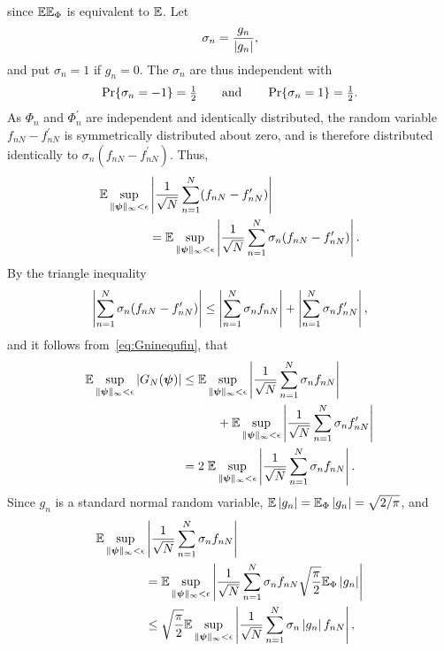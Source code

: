 \documentclass[journal]{IEEEtran}
\begin{document}
\begin{IEEEproof}
\begin{equation}
\end{equation}
since ${\mathbb E} {\mathbb E}_\Phi$ is equivalent to ${\mathbb E}$.   Let
\[
\sigma_n = \frac{g_n}{\left\vert g_n \right\vert},
\]
and put $\sigma_n = 1$ if $g_n = 0$.  The $\sigma_n$ are thus independent with 
\[
\operatorname{Pr}\{ \sigma_n = -1 \} = \tfrac{1}{2} \qquad \text{and} \qquad  \operatorname{Pr}\{ \sigma_n = 1 \} = \tfrac{1}{2}.
\]  
As $\Phi_n$ and $\Phi_n^\prime$ are independent and identically distributed, the random variable $f_{nN} - f_{nN}^\prime$ is symmetrically distributed about zero, and is therefore distributed identically to $\sigma_n( f_{nN} - f_{nN}^\prime)$.  Thus,
\begin{align*}
 {\mathbb E} \sup_{\|\boldsymbol{\psi}\|_{\infty} < \epsilon}  &\left\vert   \frac{1}{\sqrt{N}}\sum_{n=1}^{N}  (f_{nN} - f_{nN}^\prime)  \right\vert \\
&= {\mathbb E} \sup_{\|\boldsymbol{\psi}\|_{\infty} < \epsilon}  \left\vert   \frac{1}{\sqrt{N}}\sum_{n=1}^{N} \sigma_n ( f_{nN} - f_{nN}^\prime)  \right\vert.
\end{align*}
By the triangle inequality
\[
\left\vert  \sum_{n=1}^{N} \sigma_n (f_{nN} - f_{nN}^\prime) \right\vert \leq \left\vert  \sum_{n=1}^{N} \sigma_n f_{nN}  \right\vert + \left\vert  \sum_{n=1}^{N}  \sigma_n f_{nN}^\prime  \right\vert,
\]
and it follows from~\eqref{eq:Gninequfin}, that
\begin{align*}
 {\mathbb E} \sup_{\|\boldsymbol{\psi}\|_{\infty} < \epsilon} \left\vert  G_N(\boldsymbol{\psi}) \right\vert &\leq {\mathbb E} \sup_{\|\boldsymbol{\psi}\|_{\infty} < \epsilon}  \left\vert  \frac{1}{\sqrt{N}}\sum_{n=1}^{N} \sigma_n f_{nN}  \right\vert \\
&\hspace{1cm} + {\mathbb E} \sup_{\|\boldsymbol{\psi}\|_{\infty} < \epsilon}  \left\vert \frac{1}{\sqrt{N}} \sum_{n=1}^{N}  \sigma_n  f_{nN}^\prime  \right\vert \\
&= 2 \; {\mathbb E} \sup_{\|\boldsymbol{\psi}\|_{\infty} < \epsilon}  \left\vert  \frac{1}{\sqrt{N}}\sum_{n=1}^{N} \sigma_n f_{nN}  \right\vert.
\end{align*}
Since $g_n$ is a standard normal random variable, ${\mathbb E} \left\vert g_n \right\vert = {\mathbb E}_\Phi \left\vert g_n \right\vert = \sqrt{2/\pi}$,
and
\begin{align*}
\expect \sup_{\|\psibf\|_{\infty} < \epsilon}  &\abs{ \frac{1}{\sqrt{N}}\sum_{n=1}^{N} \sigma_n f_{nN} } \\
&= \expect \sup_{\|\psibf\|_{\infty} < \epsilon}  \abs{ \frac{1}{\sqrt{N}}\sum_{n=1}^{N} \sigma_n f_{nN} \sqrt{\frac{\pi}{2}}\expect_\Phi \abs{g_n}} \\
&\leq \sqrt{\frac{\pi}{2}} \expect \sup_{\|\psibf\|_{\infty} < \epsilon}  \abs{ \frac{1}{ \sqrt{N}}\sum_{n=1}^{N} \sigma_n \abs{g_n}  f_{nN}},

\end{align*}
\end{IEEEproof}
\end{document}

